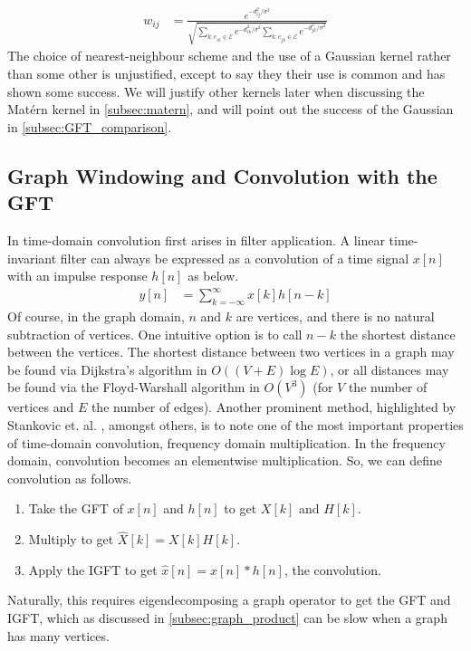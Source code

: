 \documentclass[12pt,a4paper]{article} %
\begin{document}
\begin{align*}
    w_{ij}&=\frac{e^{-d_{ij}^2/\sigma^2}}{\sqrt{\sum_{k:e_{ik}\in\mathcal{E}}e^{-d_{ik}^2/\sigma^2}\sum_{k:e_{jk}\in\mathcal{E}}e^{-d_{jk}^2/\sigma^2}}}
\end{align*}
The choice of nearest-neighbour scheme and the use of a Gaussian kernel rather than some other is unjustified, except to say they their use is common and has shown some success. We will justify other kernels later when discussing the Mat\'{e}rn kernel in \ref{subsec:matern}, and will point out the success of the Gaussian in \ref{subsec:GFT_comparison}.

\subsection{Graph Windowing and Convolution with the GFT}
\label{subsec:graph_convolve}
In time-domain convolution first arises in filter application. A linear time-invariant filter can always be expressed as a convolution of a time signal $x[n]$ with an impulse response $h[n]$ as below.
\begin{align*}
    y[n]&=\sum_{k=-\infty}^\infty x[k]h[n-k]
\end{align*}
Of course, in the graph domain, $n$ and $k$ are vertices, and there is no natural subtraction of vertices. One intuitive option is to call $n-k$ the shortest distance between the vertices. The shortest distance between two vertices in a graph may be found via Dijkstra's algorithm \cite{dijkstra} in $O((V+E)\log E)$, or all distances may be found via the Floyd-Warshall algorithm \cite{floyd} in $O(V^3)$ (for $V$ the number of vertices and $E$ the number of edges). Another prominent method, highlighted by Stankovic et. al. \cite{stankovic}, amongst others, is to note one of the most important properties of time-domain convolution, frequency domain multiplication. In the frequency domain, convolution becomes an elementwise multiplication. So, we can define convolution as follows.
\begin{enumerate}
    \item Take the GFT of $x[n]$ and $h[n]$ to get $X[k]$ and $H[k]$.
    \item Multiply to get $\hat{X}[k]=X[k]H[k]$.
    \item Apply the IGFT to get $\hat{x}[n]=x[n]*h[n]$, the convolution.
\end{enumerate}
Naturally, this requires eigendecomposing a graph operator to get the GFT and IGFT, which as discussed in \ref{subsec:graph_product} can be slow when a graph has many vertices.\\\\
\end{document}
